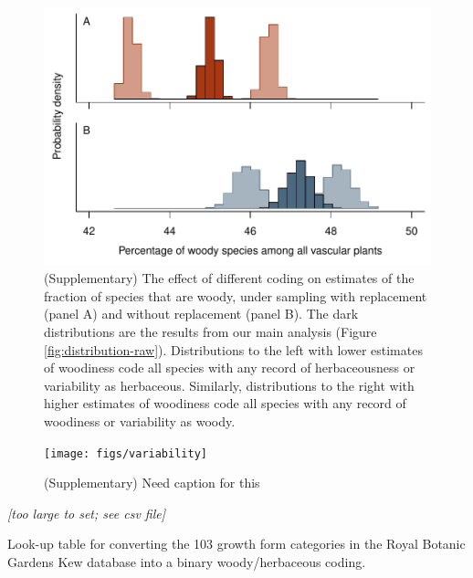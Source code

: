 \documentclass[a4paper,12pt]{article}
\begin{document}
\begin{figure}[p]
  \centering
  \includegraphics{figs/distribution-raw-errors}
  \caption{(Supplementary) The effect of different coding on estimates
    of the fraction of species that are woody, under sampling with
    replacement (panel A) and without replacement (panel B).  The dark
    distributions are the results from our main analysis (Figure
    \ref{fig:distribution-raw}).  Distributions to the left with lower
    estimates of woodiness code all species with any record of
    herbaceousness or variability as herbaceous.  Similarly,
    distributions to the right with higher estimates of woodiness code
    all species with any record of woodiness or variability as woody.}
  \label{fig:distribution-raw-errors}
\end{figure}

\begin{figure}[p]
  \centering
  \texttt{[image: figs/variability]}
  \caption{(Supplementary) Need caption for this}
  \label{fig:size-woody-herb}
\end{figure}

\begin{table}[p]
  \centering
  \textit{[too large to set; see csv file]}
  \caption{Look-up table for converting the 103 growth form categories
    in the Royal Botanic Gardens Kew database into a binary
woody/herbaceous coding.}
\label{tab:kew}
\end{table}
\end{document}
